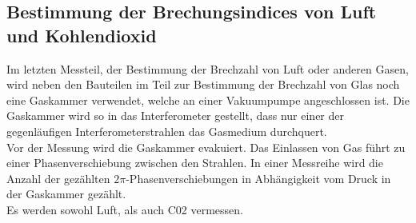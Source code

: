 \subsection{Bestimmung der Brechungsindices von Luft und Kohlendioxid}
%
Im letzten Messteil, der Bestimmung der Brechzahl von Luft oder 
anderen Gasen, wird neben den Bauteilen im Teil zur Bestimmung 
der Brechzahl von Glas noch eine Gaskammer verwendet, welche 
an einer Vakuumpumpe angeschlossen ist. Die Gaskammer wird so 
in das Interferometer gestellt, dass nur einer der gegenläufigen 
Interferometerstrahlen das Gasmedium durchquert.\\
Vor der Messung wird die Gaskammer evakuiert. Das Einlassen von 
Gas führt zu einer Phasenverschiebung zwischen den Strahlen. 
In einer Messreihe wird die Anzahl der gezählten 
$2\pi$-Phasenverschiebungen in Abhängigkeit vom Druck in der 
Gaskammer gezählt.\\
Es werden sowohl Luft, als auch C02 vermessen.
%
